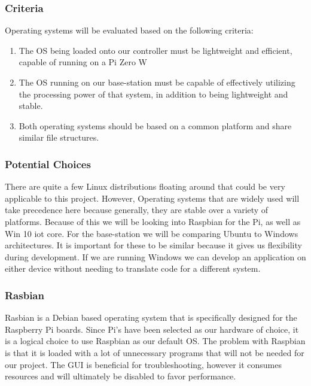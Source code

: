 \documentclass[onecolumn, draftclsnofoot,10pt, compsoc]{IEEEtran}
\begin{document}
\subsubsection{Criteria}

Operating systems will be evaluated based on the following criteria:
\begin{enumerate}
\item{The OS being loaded onto our controller must be lightweight 
and efficient, capable of running on a Pi Zero W}

\item{The OS running on our base-station must be capable of 
effectively utilizing the processing power of that system, in 
addition to being lightweight and stable.}

\item{Both operating systems should be based on a common platform 
and share similar file structures.}
\end{enumerate}

\subsubsection{Potential Choices}

There are quite a few Linux distributions floating around that 
could be very applicable to this project. However, Operating 
systems that are widely used will take precedence here because 
generally, they are stable over a variety of platforms. Because of 
this we will be looking into Raspbian for the Pi, as well as Win 10 
iot core. For the base-station we will be comparing Ubuntu to 
Windows architectures. It is important for these to be similar 
because it gives us flexibility during development. If we are 
running Windows we can develop an application on either device 
without needing to translate code for a different system.

\subsubsection{Rasbian}

Rasbian\cite{r27} is a Debian based operating system that is specifically 
designed for the Raspberry Pi boards. Since Pi's have been selected 
as our hardware of choice, it is a logical choice to use Raspbian as 
our default OS. The problem with Raspbian is that it is loaded with 
a lot of unnecessary programs that will not be needed for our 
project. The GUI is beneficial for troubleshooting, however it 
consumes resources and will ultimately be disabled to favor 
performance. 
\end{document}
